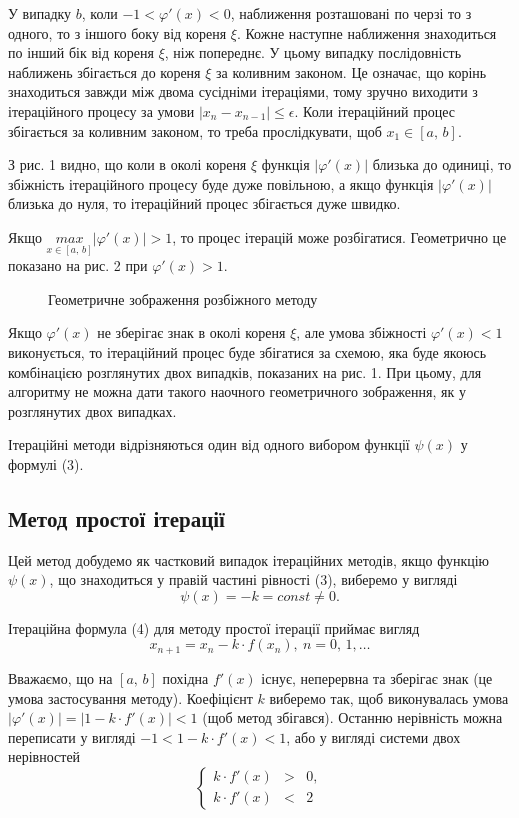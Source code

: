 \documentclass[14pt,a4paper,titlepage]{extarticle}
\begin{document}
У випадку $b$, коли $-1<\varphi'(x)<0$, наближення розташовані по черзі то з одного, то з іншого боку від кореня $\xi$. Кожне наступне наближення знаходиться по інший бік від кореня $\xi$, ніж попереднє. У цьому випадку послідовність наближень збігається до кореня $\xi$ за коливним законом. Це означає, що корінь знаходиться завжди між двома сусідніми ітераціями, тому зручно виходити з ітераційного процесу за умови $\left|x_n-x_{n-1}\right|\leqslant\epsilon$. Коли ітераційний процес збігається за коливним законом, то треба прослідкувати, щоб $x_1\in[a,\, b]$.

З рис. 1 видно, що коли в околі кореня $\xi$ функція $\left|\varphi'(x)\right|$ близька до одиниці, то збіжність ітераційного процесу буде дуже повільною, а якщо функція $\left|\varphi'(x)\right|$ близька до нуля, то ітераційний процес збігається дуже швидко.

Якщо $\underset{x\in [a,\, b]}{max}\left|\varphi'(x)\right|>1$, то процес ітерацій може розбігатися. Геометрично це показано на рис. 2 при $\varphi'(x)>1$.

\begin{figure}[h]
\center{\texttt{[image: 3]}}
\caption{Геометричне зображення розбіжного методу}
\end{figure}

Якщо $\varphi'(x)$ не зберігає знак в околі кореня $\xi$, але умова збіжності $\varphi'(x)<1$ виконується, то ітераційний процес буде збігатися за схемою, яка буде якоюсь комбінацією розглянутих двох випадків, показаних на рис. 1. При цьому, для алгоритму не можна дати такого наочного геометричного зображення, як у розглянутих двох випадках.

Ітераційні методи відрізняються один від одного вибором функції $\psi(x)$ у формулі (3).

{\centering \subsection{Метод простої ітерації}}

Цей метод добудемо як частковий випадок ітераційних методів, якщо функцію $\psi(x)$, що знаходиться у правій частині рівності (3), виберемо у вигляді
$$
\psi(x)=-k=const\neq0.
$$

Ітераційна формула (4) для методу простої ітерації приймає вигляд
$$
x_{n+1}=x_n-k\cdot f(x_n),\ n=0,\,1,\ldots
$$

Вважаємо, що на $[a,\, b]$ похідна $f'(x)$ існує, неперервна та зберігає знак (це умова застосування методу). Коефіцієнт $k$ виберемо так, щоб виконувалась умова $\left|\varphi'(x)\right|=\left|1-k\cdot f'(x)\right|<1$ (щоб метод збігався). Останню нерівність можна переписати у вигляді $-1<1-k\cdot f'(x)<1$, або у вигляді системи двох нерівностей
\begin{equation}
\left\{\begin{aligned}
k\cdot f'(x)&>&0,\\
k\cdot f'(x)&<&2
\end{aligned}
\right.
\end{equation}
\end{document}

